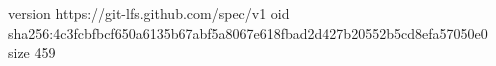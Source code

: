 version https://git-lfs.github.com/spec/v1
oid sha256:4c3fcbfbcf650a6135b67abf5a8067e618fbad2d427b20552b5cd8efa57050e0
size 459
